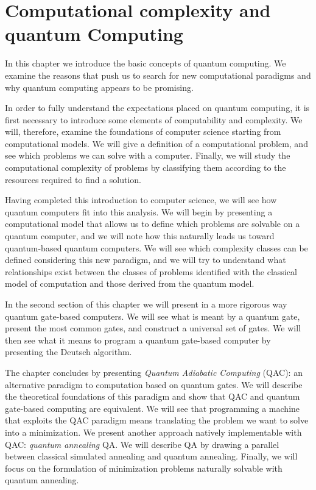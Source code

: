 \chapter{Computational complexity and quantum Computing}
\label{ch:qc}
In this chapter we introduce the basic concepts of quantum computing. We examine the reasons that push us to search for new computational paradigms and why quantum computing appears to be promising.

In order to fully understand the expectations placed on quantum computing, it is first necessary to introduce some elements of computability and complexity. We will, therefore, examine the foundations of computer science starting from computational models. We will give a definition of a computational problem, and see which problems we can solve with a computer. Finally, we will study the computational complexity of problems by classifying them according to the resources required to find a solution.

Having completed this introduction to computer science, we will see how quantum computers fit into this analysis. We will begin by presenting a computational model that allows us to define which problems are solvable on a quantum computer, and we will note how this naturally leads us toward quantum-based quantum computers. We will see which complexity classes can be defined considering this new paradigm, and we will try to understand what relationships exist between the classes of problems identified with the classical model of computation and those derived from the quantum model.

In the second section of this chapter we will present in a more rigorous way quantum gate-based computers. We will see what is meant by a quantum gate, present the most common gates, and construct a universal set of gates. We will then see what it means to program a quantum gate-based computer by presenting the Deutsch algorithm.

The chapter concludes by presenting \emph{Quantum Adiabatic Computing} (QAC): an alternative paradigm to computation based on quantum gates. We will describe the theoretical foundations of this paradigm and show that QAC and quantum gate-based computing are equivalent. We will see that programming a machine that exploits the QAC paradigm means translating the problem we want to solve into a minimization.
We present another approach natively implementable with QAC: \emph{quantum annealing} QA. We will describe QA by drawing a parallel between classical simulated annealing and quantum annealing. Finally, we will focus on the formulation of minimization problems naturally solvable with quantum annealing.

